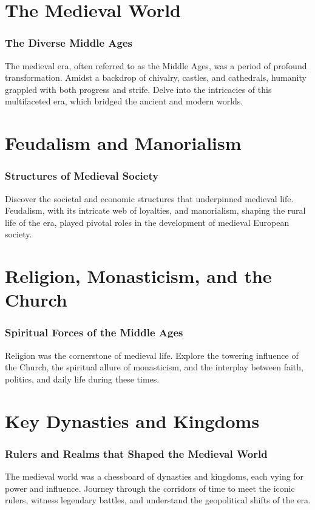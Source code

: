\documentclass[a4paper,12pt]{book}
\begin{document}
\chapter{The Medieval World}
\subsection*{The Diverse Middle Ages}
The medieval era, often referred to as the Middle Ages, was a period of profound transformation. Amidst a backdrop of chivalry, castles, and cathedrals, humanity grappled with both progress and strife. Delve into the intricacies of this multifaceted era, which bridged the ancient and modern worlds.

\chapter{Feudalism and Manorialism}
\subsection*{Structures of Medieval Society}
Discover the societal and economic structures that underpinned medieval life. Feudalism, with its intricate web of loyalties, and manorialism, shaping the rural life of the era, played pivotal roles in the development of medieval European society.

\chapter{Religion, Monasticism, and the Church}
\subsection*{Spiritual Forces of the Middle Ages}
Religion was the cornerstone of medieval life. Explore the towering influence of the Church, the spiritual allure of monasticism, and the interplay between faith, politics, and daily life during these times.

\chapter{Key Dynasties and Kingdoms}
\subsection*{Rulers and Realms that Shaped the Medieval World}
The medieval world was a chessboard of dynasties and kingdoms, each vying for power and influence. Journey through the corridors of time to meet the iconic rulers, witness legendary battles, and understand the geopolitical shifts of the era.
\end{document}
